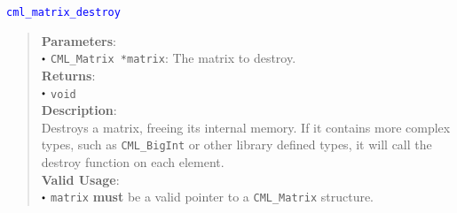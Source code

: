 \documentclass[a4paper,oneside,8pt]{extarticle}
\newcommand{\function}[1]{
  \noindent\textcolor{blue}{\texttt{#1}}
  \vspace{-0.3em}
}
\renewcommand{\dot}{\raisebox{0.3ex}{\scalebox{0.6}{$\bullet$}}}
\theoremstyle{definition}
\begin{document}
\function{cml\_matrix\_destroy}
\begin{quote}
  \textbf{Parameters}: \\
  $\dot$ \texttt{CML\_Matrix *matrix}: The matrix to destroy. \\
  \textbf{Returns}: \\
  $\dot$ \texttt{void} \\
  
  \vspace{-0.75em}
  \textbf{Description}: \\
  Destroys a matrix, freeing its internal memory. If it contains more complex types, such as \texttt{CML\_BigInt} or other library defined types, it will call the destroy function on each element. \\

  \vspace{-0.75em}
  \textbf{Valid Usage}: \\
  $\dot$ \texttt{matrix} \textbf{must} be a valid pointer to a \texttt{CML\_Matrix} structure. \\
\end{quote}
\end{document}
